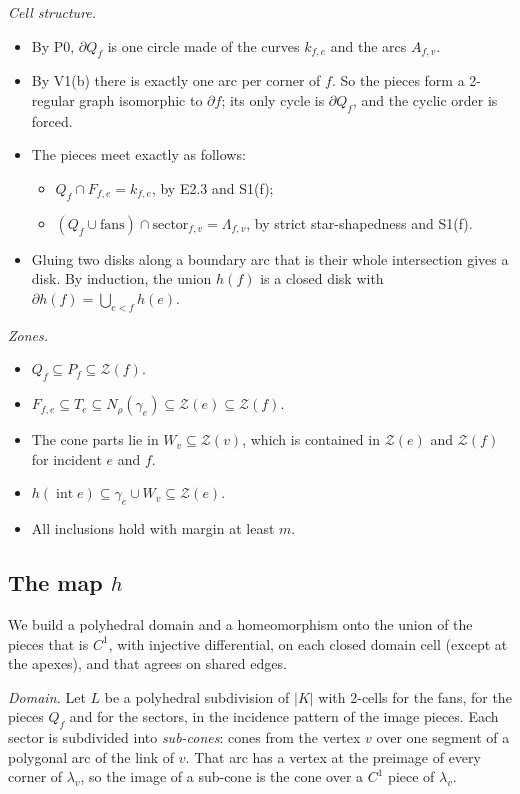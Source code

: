 \documentclass[preprint,12pt]{elsarticle}
\theoremstyle{definition}
\theoremstyle{remark}
\newcommand{\Z}{\mathcal{Z}}
\newcommand{\inter}{\operatorname{int}}
\begin{document}
\emph{Cell structure.}
\begin{itemize}
\item By P0, $\partial Q_f$ is one circle made of the curves $k_{f,e}$ and the arcs $A_{f,v}$.
\item By V1(b) there is exactly one arc per corner of $f$. So the pieces form a 2-regular graph isomorphic to
$\partial f$; its only cycle is $\partial Q_f$, and the cyclic order is forced.
\item The pieces meet exactly as follows:
  \begin{itemize}
  \item $Q_f\cap F_{f,e}=k_{f,e}$, by E2.3 and S1(f);
  \item $(Q_f\cup\text{fans})\cap\text{sector}_{f,v}=\Lambda_{f,v}$, by strict star-shapedness and S1(f).
  \end{itemize}
\item Gluing two disks along a boundary arc that is their whole intersection gives a disk. By induction, the union
$h(f)$ is a closed disk with $\partial h(f)=\bigcup_{e<f}h(e)$.
\end{itemize}

\emph{Zones.}
\begin{itemize}
\item $Q_f\subseteq P_f\subseteq\Z(f)$.
\item $F_{f,e}\subseteq T_e\subseteq N_\rho(\gamma_e)\subseteq\Z(e)\subseteq\Z(f)$.
\item The cone parts lie in $W_v\subseteq\Z(v)$, which is contained in $\Z(e)$ and $\Z(f)$ for incident $e$ and $f$.
\item $h(\inter e)\subseteq\gamma_e\cup W_v\subseteq\Z(e)$.
\item All inclusions hold with margin at least $m$.
\end{itemize}

\subsection{The map $h$}
We build a polyhedral domain and a homeomorphism onto the union of the pieces that is $C^1$, with injective
differential, on each closed domain cell (except at the apexes), and that agrees on shared edges.

\emph{Domain.} Let $L$ be a polyhedral subdivision of $|K|$ with 2-cells for the fans, for the pieces $Q_f$ and for the
sectors, in the incidence pattern of the image pieces. Each sector is subdivided into \emph{sub-cones}: cones from the
vertex $v$ over one segment of a polygonal arc of the link of $v$. That arc has a vertex at the preimage of every corner
of $\lambda_v$, so the image of a sub-cone is the cone over a $C^1$ piece of $\lambda_v$.
\end{document}
